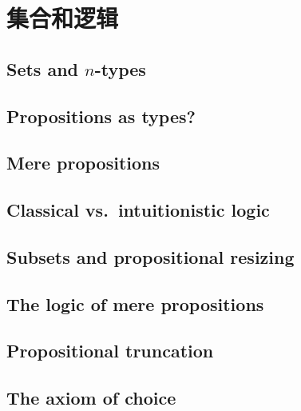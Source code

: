 \chapter{集合和逻辑}
\label{cha:logic}


\section{Sets and \texorpdfstring{$n$}{n}-types}
\label{sec:basics-sets}


\section{Propositions as types?}
\label{subsec:pat?}


\section{Mere propositions}
\label{subsec:hprops}


\section{Classical vs.\ intuitionistic logic}
\label{sec:intuitionism}


\section{Subsets and propositional resizing}
\label{subsec:prop-subsets}


\section{The logic of mere propositions}
\label{subsec:logic-hprop}


\section{Propositional truncation}
\label{subsec:prop-trunc}


\section{The axiom of choice}
\label{sec:axiom-choice}


